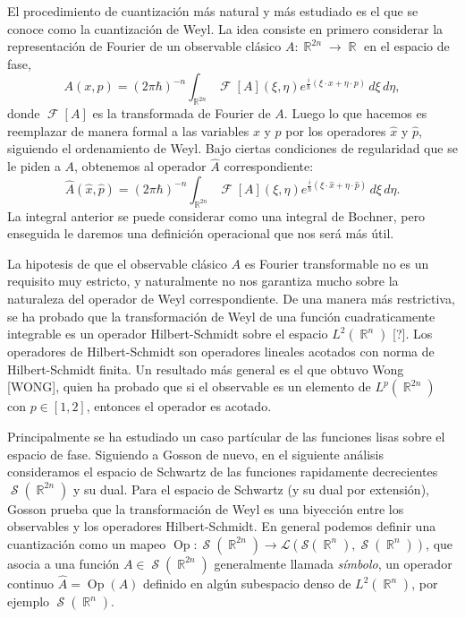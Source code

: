 \documentclass[a4paper]{report}
\DeclareMathOperator{\R}{\mathbb{R}}
\DeclareMathOperator{\Sz}{\mathcal S}
\DeclareMathOperator{\Op}{Op}
\DeclareMathOperator{\F}{\mathcal{F}}
\begin{document}
  El procedimiento de cuantización más natural y más
  estudiado es el que se conoce como la cuantización de
  Weyl.  La idea consiste en primero considerar la
  representación de Fourier de un observable clásico $A :
  \R^{2n} \to \R$ en el espacio de fase,
  \begin{equation}
    A(x,p)
    = (2\pi\hbar)^{-n} \int_{\R^{2n}} \F[A](\xi,
    \eta) e^{\frac{i}{\hbar} \left( \xi \cdot x + \eta \cdot
    p\right) } \, d\xi \, d\eta,
  \end{equation}
  donde $\F[A]$ es la transformada de Fourier de $A$. Luego
  lo que hacemos es reemplazar de manera formal a las
  variables $x$ y $p$ por los operadores $\hat{x}$ y
  $\hat{p}$, siguiendo el ordenamiento de Weyl. Bajo ciertas
  condiciones de regularidad que se le piden a $A$,
  obtenemos al operador $\hat{A}$ correspondiente:
  \begin{equation}
    \label{eqn:weyl_quant_1}
    \hat{A}(\hat{x},\hat{p})
    = (2\pi\hbar)^{-n} \int_{\R^{2n}} \F[A](\xi,\eta)
      e^{\frac{i}{\hbar} \left( \xi \cdot \hat{x} + \eta
      \cdot \hat{p}\right) } \, d\xi \, d\eta.
  \end{equation}
  La integral anterior se puede considerar como una integral
  de Bochner, pero enseguida le daremos una definición
  operacional que nos será más útil.

  La hipotesis de que el observable clásico $A$ es Fourier
  transformable no es un requisito muy estricto, y
  naturalmente no nos garantiza mucho sobre la naturaleza
  del operador de Weyl correspondiente. De una manera más
  restrictiva, se ha probado que la transformación de Weyl
  de una función cuadraticamente integrable es un operador
  Hilbert-Schmidt sobre el espacio $L^2(\R^{n})$ [?]. Los
  operadores de Hilbert-Schmidt son operadores lineales
  acotados con norma de Hilbert-Schmidt finita. Un resultado
  más general es el que obtuvo Wong [WONG], quien ha probado
  que si el observable es un elemento de $L^{p}(\R^{2n})$
  con $p \in [1,2]$, entonces el operador es acotado.
  
  Principalmente se ha estudiado un caso partícular de las
  funciones lisas sobre el espacio de fase. Siguiendo a
  Gosson de nuevo, en el siguiente análisis consideramos el
  espacio de Schwartz de las funciones rapidamente
  decrecientes $\Sz(\R^{2n})$ y su dual. Para el espacio de
  Schwartz (y su dual por extensión), Gosson prueba que la
  transformación de Weyl es una biyección entre los
  observables y los operadores Hilbert-Schmidt. En general
  podemos definir una cuantización como un mapeo $\Op :
  \Sz(\R^{2n}) \to \mathcal L\left(\mathcal S(\R^{n}),
  \Sz(\R^{n})\right)$, que asocia a una función $A \in
  \Sz(\R^{2n})$ generalmente llamada \textit{símbolo}, un
  operador continuo $\hat{A} = \Op(A)$ definido en algún
  subespacio denso de $L^2(\R^{n})$, por ejemplo
  $\Sz(\R^{n})$.
\end{document}
